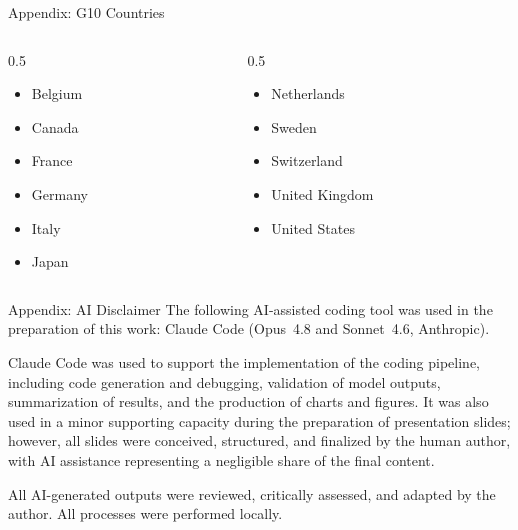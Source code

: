 \documentclass[10pt]{beamer}
\begin{document}
\begin{frame}{Appendix: G10 Countries}
  \begin{columns}[T]
    \begin{column}{0.5\textwidth}
      \begin{itemize}
        \item Belgium
        \item Canada
        \item France
        \item Germany
        \item Italy
        \item Japan
      \end{itemize}
    \end{column}
    \begin{column}{0.5\textwidth}
      \begin{itemize}
        \item Netherlands
        \item Sweden
        \item Switzerland
        \item United Kingdom
        \item United States
      \end{itemize}
    \end{column}
  \end{columns}
\end{frame}

\begin{frame}{Appendix: AI Disclaimer}
  \small
  The following AI-assisted coding tool was used in the preparation of this
  work: Claude Code (Opus~4.8 and Sonnet~4.6, Anthropic).

  \medskip
  Claude Code was used to support the implementation of the coding pipeline,
  including code generation and debugging, validation of model outputs,
  summarization of results, and the production of charts and figures. It was
  also used in a minor supporting capacity during the preparation of
  presentation slides; however, all slides were conceived, structured, and
  finalized by the human author, with AI assistance representing a negligible
  share of the final content.

  \medskip
  All AI-generated outputs were reviewed, critically assessed, and adapted by
  the author. All processes were performed locally.
\end{frame}
\end{document}
